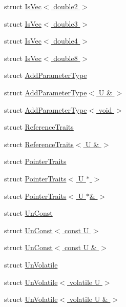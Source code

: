 \begin{DoxyCompactItemize}
struct \hyperlink{structcv_1_1gpu_1_1device_1_1type__traits__detail_1_1IsVec_3_01double2_01_4}{Is\-Vec$<$ double2 $>$}
\item 
struct \hyperlink{structcv_1_1gpu_1_1device_1_1type__traits__detail_1_1IsVec_3_01double3_01_4}{Is\-Vec$<$ double3 $>$}
\item 
struct \hyperlink{structcv_1_1gpu_1_1device_1_1type__traits__detail_1_1IsVec_3_01double4_01_4}{Is\-Vec$<$ double4 $>$}
\item 
struct \hyperlink{structcv_1_1gpu_1_1device_1_1type__traits__detail_1_1IsVec_3_01double8_01_4}{Is\-Vec$<$ double8 $>$}
\item 
struct \hyperlink{structcv_1_1gpu_1_1device_1_1type__traits__detail_1_1AddParameterType}{Add\-Parameter\-Type}
\item 
struct \hyperlink{structcv_1_1gpu_1_1device_1_1type__traits__detail_1_1AddParameterType_3_01U_01_6_01_4}{Add\-Parameter\-Type$<$ U \& $>$}
\item 
struct \hyperlink{structcv_1_1gpu_1_1device_1_1type__traits__detail_1_1AddParameterType_3_01void_01_4}{Add\-Parameter\-Type$<$ void $>$}
\item 
struct \hyperlink{structcv_1_1gpu_1_1device_1_1type__traits__detail_1_1ReferenceTraits}{Reference\-Traits}
\item 
struct \hyperlink{structcv_1_1gpu_1_1device_1_1type__traits__detail_1_1ReferenceTraits_3_01U_01_6_01_4}{Reference\-Traits$<$ U \& $>$}
\item 
struct \hyperlink{structcv_1_1gpu_1_1device_1_1type__traits__detail_1_1PointerTraits}{Pointer\-Traits}
\item 
struct \hyperlink{structcv_1_1gpu_1_1device_1_1type__traits__detail_1_1PointerTraits_3_01U_01_5_01_4}{Pointer\-Traits$<$ U $\ast$ $>$}
\item 
struct \hyperlink{structcv_1_1gpu_1_1device_1_1type__traits__detail_1_1PointerTraits_3_01U_01_5_6_01_4}{Pointer\-Traits$<$ U $\ast$\& $>$}
\item 
struct \hyperlink{structcv_1_1gpu_1_1device_1_1type__traits__detail_1_1UnConst}{Un\-Const}
\item 
struct \hyperlink{structcv_1_1gpu_1_1device_1_1type__traits__detail_1_1UnConst_3_01const_01U_01_4}{Un\-Const$<$ const U $>$}
\item 
struct \hyperlink{structcv_1_1gpu_1_1device_1_1type__traits__detail_1_1UnConst_3_01const_01U_01_6_01_4}{Un\-Const$<$ const U \& $>$}
\item 
struct \hyperlink{structcv_1_1gpu_1_1device_1_1type__traits__detail_1_1UnVolatile}{Un\-Volatile}
\item 
struct \hyperlink{structcv_1_1gpu_1_1device_1_1type__traits__detail_1_1UnVolatile_3_01volatile_01U_01_4}{Un\-Volatile$<$ volatile U $>$}
\item 
struct \hyperlink{structcv_1_1gpu_1_1device_1_1type__traits__detail_1_1UnVolatile_3_01volatile_01U_01_6_01_4}{Un\-Volatile$<$ volatile U \& $>$}
\end{DoxyCompactItemize}
